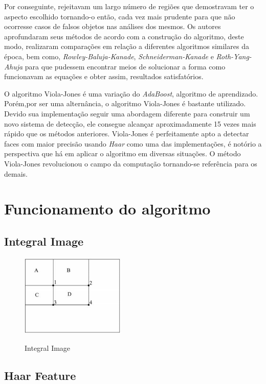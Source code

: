 \documentclass[12pt,a4paper]{article}
\begin{document}
Por conseguinte, rejeitavam um largo número de regiões que demostravam ter o aspecto escolhido tornando-o então, cada vez mais prudente para que não ocorresse casos de falsos objetos nas análises dos mesmos. Os autores aprofundaram seus métodos de acordo com a construção do algoritmo, deste modo, realizaram comparações em relação a diferentes algoritmos similares da época, bem como, \textit{Rowley-Baluja-Kanade}, \textit{Schneiderman-Kanade} e\textit{ Roth-Yang-Ahuja} para que pudessem encontrar meios de solucionar a forma como funcionavam as equações e obter assim, resultados satisfatórios. 

O algoritmo Viola-Jones é uma variação do \textit{AdaBoost}, algoritmo de aprendizado. Porém,por ser uma alternância, o algoritmo Viola-Jones é bastante utilizado. Devido sua implementação seguir uma abordagem diferente para construir um novo sistema de detecção, ele consegue alcançar aproximadamente 15 vezes mais rápido que os métodos anteriores. Viola-Jones é perfeitamente apto a detectar faces com maior precisão usando \textit{Haar} como uma das implementações, é notório a perspectiva que há em aplicar o algoritmo em diversas situações. O método Viola-Jones revolucionou o campo da computação tornando-se referência para os demais. 

\section{Funcionamento do algoritmo} 

\subsection{Integral Image}


\begin{figure}[h!]
\centering
\includegraphics[width=5cm]{recursos/imagens/Integral.png}
\label{4}
\caption{Integral Image}
\end{figure} 

\subsection{Haar Feature}
\end{document}
